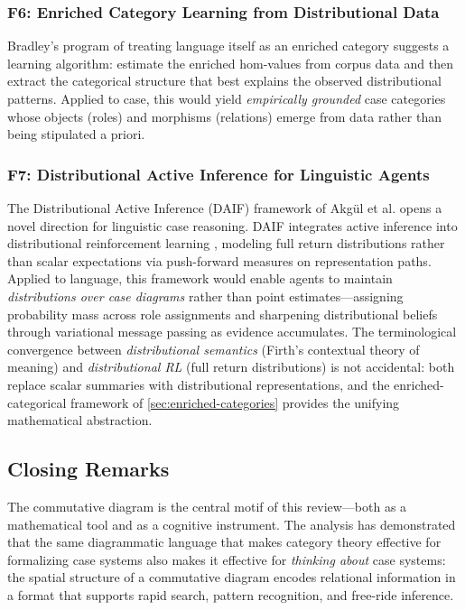 \documentclass[
]{article}
\numberwithin{equation}{section}
\begin{document}
\subsubsection{F6: Enriched Category Learning from Distributional
Data}\label{f6-enriched-category-learning-from-distributional-data}

Bradley's
\citetext{\citeyear{bradley2024ipam}; \citeyear{bradley2025tea}} program
of treating language itself as an enriched category suggests a learning
algorithm: estimate the enriched hom-values from corpus data and then
extract the categorical structure that best explains the observed
distributional patterns. Applied to case, this would yield
\emph{empirically grounded} case categories whose objects (roles) and
morphisms (relations) emerge from data rather than being stipulated a
priori.

\subsubsection{F7: Distributional Active Inference for Linguistic
Agents}\label{f7-distributional-active-inference-for-linguistic-agents}

The Distributional Active Inference (DAIF) framework of Akgül et al.
\citeyearpar{akgul2026distributional} opens a novel direction for
linguistic case reasoning. DAIF integrates active inference into
distributional reinforcement learning
\citep{bellemare2017distributional}, modeling full return distributions
rather than scalar expectations via push-forward measures on
representation paths. Applied to language, this framework would enable
agents to maintain \emph{distributions over case diagrams} rather than
point estimates---assigning probability mass across role assignments and
sharpening distributional beliefs through variational message passing as
evidence accumulates. The terminological convergence between
\emph{distributional semantics} (Firth's \citeyearpar{firth1957papers}
contextual theory of meaning) and \emph{distributional RL} (full return
distributions) is not accidental: both replace scalar summaries with
distributional representations, and the enriched-categorical framework
of \autoref{sec:enriched-categories} provides the unifying mathematical
abstraction.

\subsection{Closing Remarks}\label{closing-remarks}

The commutative diagram is the central motif of this review---both as a
mathematical tool and as a cognitive instrument. The analysis has
demonstrated that the same diagrammatic language that makes category
theory effective for formalizing case systems also makes it effective
for \emph{thinking about} case systems: the spatial structure of a
commutative diagram encodes relational information in a format that
supports rapid search, pattern recognition, and free-ride inference.
\end{document}
